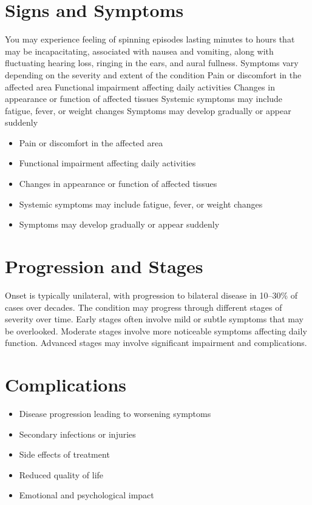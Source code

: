 \section{Signs and Symptoms}
You may experience feeling of spinning episodes lasting minutes to hours that may be incapacitating, associated with nausea and vomiting, along with fluctuating hearing loss, ringing in the ears, and aural fullness. Symptoms vary depending on the severity and extent of the condition Pain or discomfort in the affected area Functional impairment affecting daily activities Changes in appearance or function of affected tissues Systemic symptoms may include fatigue, fever, or weight changes Symptoms may develop gradually or appear suddenly

\begin{itemize}[noitemsep]
  \item Pain or discomfort in the affected area
  \item Functional impairment affecting daily activities
  \item Changes in appearance or function of affected tissues
  \item Systemic symptoms may include fatigue, fever, or weight changes
  \item Symptoms may develop gradually or appear suddenly
\end{itemize}
\section{Progression and Stages}
Onset is typically unilateral, with progression to bilateral disease in 10--30\% of cases over decades. The condition may progress through different stages of severity over time. Early stages often involve mild or subtle symptoms that may be overlooked. Moderate stages involve more noticeable symptoms affecting daily function. Advanced stages may involve significant impairment and complications.
\section{Complications}
\begin{itemize}[noitemsep]
  \item Disease progression leading to worsening symptoms
  \item Secondary infections or injuries
  \item Side effects of treatment
  \item Reduced quality of life
  \item Emotional and psychological impact
\end{itemize}
